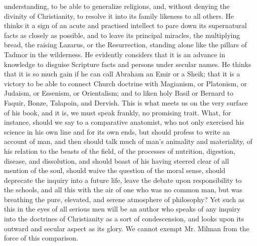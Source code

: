 understanding, to be able to generalize religions, and, without
denying the divinity of Christianity, to resolve it into its family
likeness to all others. He thinks it a sign of an acute and practised
intellect to pare down its supernatural facts as closely as possible,
and to leave its principal miracles, the multiplying bread, the
raising Lazarus, or the Resurrection, standing alone like the pillars
of Tadmor in the wilderness. He evidently considers that it is
an advance in knowledge to disguise Scripture facts and persons under
secular names. He thinks that it is so much gain if he can call
Abraham an Emir or a Sheik; that it is a victory to be able to connect
Church doctrine with Magianism, or Platonism, or Judaism, or Essenism,
or Orientalism; and to liken holy Basil or Bernard to Faquir, Bonze,
Talapoin, and Dervish. This is what meets us on the very surface of
his book, and it is, we must speak frankly, no promising trait. What,
for instance, should we say to a comparative anatomist, who not only
exercised his science in his own line and for its own ends, but should
profess to write an account of man, and then should talk much of man's
animality and materiality, of his relation to the beasts of the field,
of the processes of nutrition, digestion, disease, and dissolution,
and should boast of his having steered clear of all mention of the
soul, should waive the question of the moral sense, should deprecate
the inquiry into a future life, leave the debate upon responsibility
to the schools, and all this with the air of one who was no common
man, but was breathing the pure, elevated, and serene atmosphere of
philosophy? Yet such as this in the eyes of all serious men will be an
author who speaks of any inquiry into the doctrines of Christianity as
a sort of condescension, and looks upon its outward and secular aspect
as its glory. We cannot exempt Mr. Milman from the force of this
comparison.

